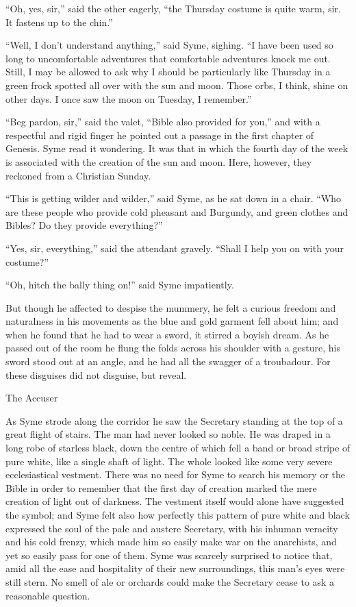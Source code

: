 “Oh, yes, sir,” said the other eagerly, “the Thursday costume is quite warm, sir. It fastens up to the chin.”

“Well, I don’t understand anything,” said Syme, sighing. “I have been used so long to uncomfortable adventures that comfortable adventures knock me out. Still, I may be allowed to ask why I should be particularly like Thursday in a green frock spotted all over with the sun and moon. Those orbs, I think, shine on other days. I once saw the moon on Tuesday, I remember.”

“Beg pardon, sir,” said the valet, “Bible also provided for you,” and with a respectful and rigid finger he pointed out a passage in the first chapter of Genesis. Syme read it wondering. It was that in which the fourth day of the week is associated with the creation of the sun and moon. Here, however, they reckoned from a Christian Sunday.

“This is getting wilder and wilder,” said Syme, as he sat down in a chair. “Who are these people who provide cold pheasant and Burgundy, and green clothes and Bibles? Do they provide everything?”

“Yes, sir, everything,” said the attendant gravely. “Shall I help you on with your costume?”

“Oh, hitch the bally thing on!” said Syme impatiently.

But though he affected to despise the mummery, he felt a curious freedom and naturalness in his movements as the blue and gold garment fell about him; and when he found that he had to wear a sword, it stirred a boyish dream. As he passed out of the room he flung the folds across his shoulder with a gesture, his sword stood out at an angle, and he had all the swagger of a troubadour. For these disguises did not disguise, but reveal.

\chap The Accuser

As Syme strode along the corridor he saw the Secretary standing at the top of a great flight of stairs. The man had never looked so noble. He was draped in a long robe of starless black, down the centre of which fell a band or broad stripe of pure white, like a single shaft of light. The whole looked like some very severe ecclesiastical vestment. There was no need for Syme to search his memory or the Bible in order to remember that the first day of creation marked the mere creation of light out of darkness. The vestment itself would alone have suggested the symbol; and Syme felt also how perfectly this pattern of pure white and black expressed the soul of the pale and austere Secretary, with his inhuman veracity and his cold frenzy, which made him so easily make war on the anarchists, and yet so easily pass for one of them. Syme was scarcely surprised to notice that, amid all the ease and hospitality of their new surroundings, this man’s eyes were still stern. No smell of ale or orchards could make the Secretary cease to ask a reasonable question.

